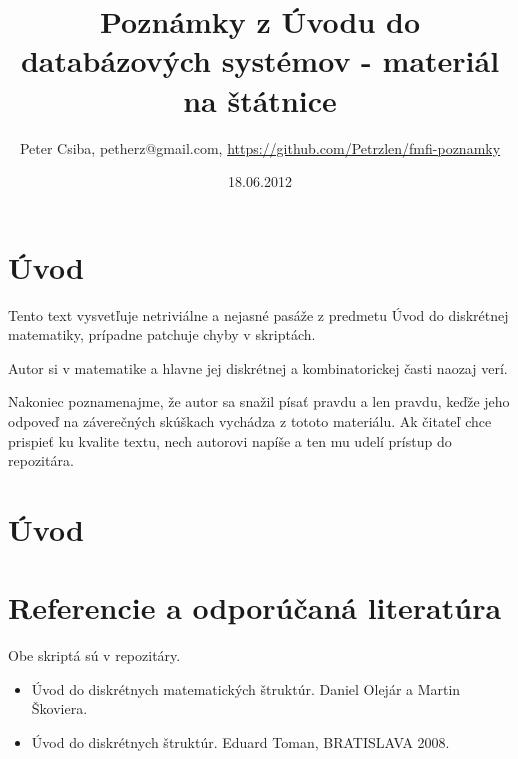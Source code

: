 \documentclass[10pt,a4paper]{article}
\title{Poznámky z Úvodu do databázových systémov - materiál na štátnice}
\date{18.06.2012}
\author{Peter Csiba, petherz@gmail.com, \url{https://github.com/Petrzlen/fmfi-poznamky}}
\begin{document}
\maketitle
\tableofcontents

\clearpage

\section*{Úvod}   

Tento text vysvetľuje netriviálne a nejasné pasáže z predmetu Úvod do diskrétnej matematiky,
prípadne patchuje chyby v skriptách. 

Autor si v matematike a hlavne jej diskrétnej a kombinatorickej časti naozaj verí. 

Nakoniec poznamenajme, že autor sa snažil písať pravdu a len pravdu, keďže jeho odpoveď na záverečných skúškach vychádza z tototo materiálu.
Ak čitateľ chce prispieť ku kvalite textu, nech autorovi napíše a ten mu udelí prístup do repozitára.

\section*{Úvod}   

\clearpage
\section*{Referencie a odporúčaná literatúra}
Obe skriptá sú v repozitáry. 

\begin{itemize}                                
\item Úvod do diskrétnych matematických štruktúr. Daniel Olejár a Martin Škoviera.
\item Úvod do diskrétnych štruktúr. Eduard Toman, BRATISLAVA 2008.
\end{itemize}
\end{document}
